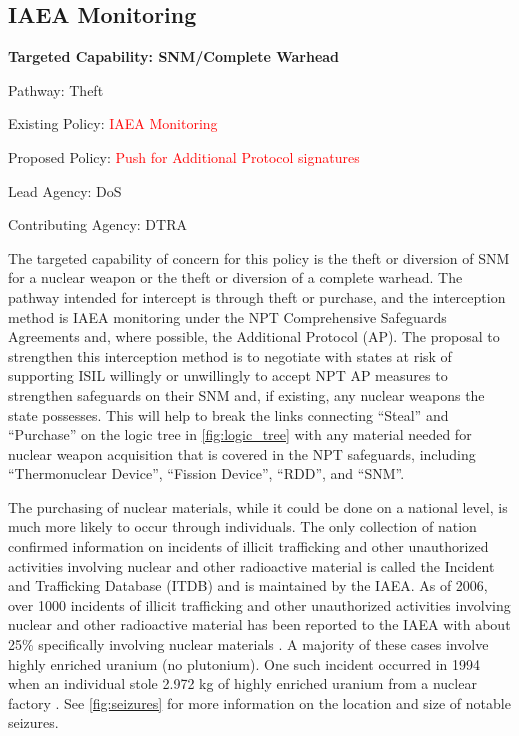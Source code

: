 \documentclass{report}
\begin{document}
\subsection{IAEA Monitoring}



\bfseries Targeted Capability: SNM/Complete Warhead

Pathway: Theft

Existing Policy:  \textcolor{red}{IAEA Monitoring}

Proposed Policy:  \textcolor{red}{Push for Additional Protocol signatures}

Lead Agency: DoS

Contributing Agency: DTRA \normalfont

The targeted capability of concern for this policy is the theft or diversion of SNM for a nuclear weapon or the theft or diversion of a complete warhead. The pathway intended for intercept is through theft or purchase, and the interception method is IAEA monitoring under the NPT Comprehensive Safeguards Agreements and, where possible, the Additional Protocol (AP). The proposal to strengthen this interception method is to negotiate with states at risk of supporting ISIL willingly or unwillingly to accept NPT AP measures to strengthen safeguards on their SNM and, if existing, any nuclear weapons the state possesses. This will help to break the links connecting \enquote{Steal} and \enquote{Purchase} on the logic tree in \autoref{fig:logic_tree} with any material needed for nuclear weapon acquisition that is covered in the NPT safeguards, including \enquote{Thermonuclear Device}, \enquote{Fission Device}, \enquote{RDD}, and \enquote{SNM}. 



The purchasing of nuclear materials, while it could be done on a national level, is much more likely to occur through individuals. The only collection of nation confirmed information on incidents of illicit trafficking and other unauthorized activities involving nuclear and other radioactive material is called the Incident and Trafficking Database (ITDB) and is maintained by the IAEA. As of 2006, over 1000 incidents of illicit trafficking and other unauthorized activities involving nuclear and other radioactive material has been reported to the IAEA with about 25\% specifically involving nuclear materials \cite{Iaea2007}. A majority of these cases involve highly enriched uranium (no plutonium). One such incident occurred in 1994 when an individual stole 2.972 kg of highly enriched uranium from a nuclear factory \cite{Iaea2007}. See \autoref{fig:seizures} for more information on the location and size of notable seizures. 
\end{document}
